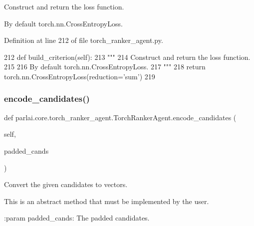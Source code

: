 \begin{DoxyVerb}Construct and return the loss function.

By default torch.nn.CrossEntropyLoss.
\end{DoxyVerb}
 

Definition at line 212 of file torch\+\_\+ranker\+\_\+agent.\+py.


\begin{DoxyCode}
212     \textcolor{keyword}{def }build\_criterion(self):
213         \textcolor{stringliteral}{"""}
214 \textcolor{stringliteral}{        Construct and return the loss function.}
215 \textcolor{stringliteral}{}
216 \textcolor{stringliteral}{        By default torch.nn.CrossEntropyLoss.}
217 \textcolor{stringliteral}{        """}
218         \textcolor{keywordflow}{return} torch.nn.CrossEntropyLoss(reduction=\textcolor{stringliteral}{'sum'})
219 
\end{DoxyCode}
\mbox{\label{classparlai_1_1core_1_1torch__ranker__agent_1_1TorchRankerAgent_a1c8e4925f558783a51a28ccb577c42c7}} 
\subsubsection{\texorpdfstring{encode\+\_\+candidates()}{encode\_candidates()}}
{\footnotesize\ttfamily def parlai.\+core.\+torch\+\_\+ranker\+\_\+agent.\+Torch\+Ranker\+Agent.\+encode\+\_\+candidates (\begin{DoxyParamCaption}\item[{}]{self,  }\item[{}]{padded\+\_\+cands }\end{DoxyParamCaption})}

\begin{DoxyVerb}Convert the given candidates to vectors.

This is an abstract method that must be implemented by the user.

:param padded_cands:
    The padded candidates.
\end{DoxyVerb}
 

